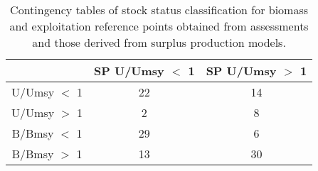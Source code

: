 \begin{table}[ht]
\begin{center}
\begin{tabular}{ccc}
  \hline
 & SP U/Umsy $<$ 1 & SP U/Umsy $>$ 1 \\ 
  \hline
U/Umsy $<$ 1 &  22 &  14 \\ 
  U/Umsy $>$ 1 &   2 &   8 \\ 
  B/Bmsy $<$ 1 &  29 &   6 \\ 
  B/Bmsy $>$ 1 &  13 &  30 \\ 
   \hline
\end{tabular}
\caption{Contingency tables of stock status classification for biomass and exploitation reference points obtained from assessments and those derived from surplus production models. }
\label{tab:contingency}
\end{center}
\end{table}

